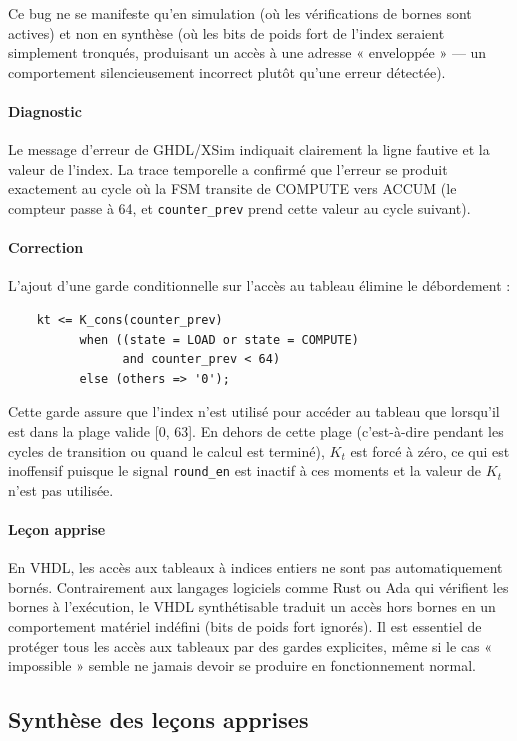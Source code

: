 Ce bug ne se manifeste qu'en simulation (où les vérifications de bornes sont actives) et non en synthèse (où les bits de poids fort de l'index seraient simplement tronqués, produisant un accès à une adresse « enveloppée » --- un comportement silencieusement incorrect plutôt qu'une erreur détectée).

\paragraph{Diagnostic} Le message d'erreur de GHDL/XSim indiquait clairement la ligne fautive et la valeur de l'index. La trace temporelle a confirmé que l'erreur se produit exactement au cycle où la FSM transite de COMPUTE vers ACCUM (le compteur passe à 64, et \texttt{counter\_prev} prend cette valeur au cycle suivant).

\paragraph{Correction} L'ajout d'une garde conditionnelle sur l'accès au tableau élimine le débordement :

\begin{verbatim}
    kt <= K_cons(counter_prev)
          when ((state = LOAD or state = COMPUTE)
                and counter_prev < 64)
          else (others => '0');
\end{verbatim}

Cette garde assure que l'index n'est utilisé pour accéder au tableau que lorsqu'il est dans la plage valide [0, 63]. En dehors de cette plage (c'est-à-dire pendant les cycles de transition ou quand le calcul est terminé), $K_t$ est forcé à zéro, ce qui est inoffensif puisque le signal \texttt{round\_en} est inactif à ces moments et la valeur de $K_t$ n'est pas utilisée.

\paragraph{Leçon apprise} En VHDL, les accès aux tableaux à indices entiers ne sont pas automatiquement bornés. Contrairement aux langages logiciels comme Rust ou Ada qui vérifient les bornes à l'exécution, le VHDL synthétisable traduit un accès hors bornes en un comportement matériel indéfini (bits de poids fort ignorés). Il est essentiel de protéger tous les accès aux tableaux par des gardes explicites, même si le cas « impossible » semble ne jamais devoir se produire en fonctionnement normal.

\subsection{Synthèse des leçons apprises}

